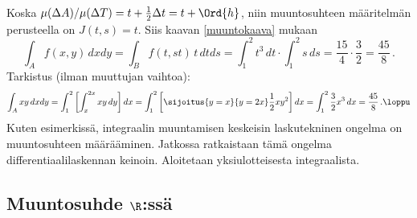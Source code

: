 Koska $\mu(\Delta A)/\mu(\Delta T)=t+\frac{1}{2}\Delta t = t + \Ord{h}$, niin muuntosuhteen
määritelmän perusteella on $J(t,s)=t$. Siis kaavan \eqref{muuntokaava} mukaan
\[
\int_A f(x,y)\,dxdy = \int_B f(t,st)\,t\,dtds = \int_1^2 t^3\,dt\cdot\int_1^2 s\,ds 
                    = \frac{15}{4}\cdot\frac{3}{2} = \frac{45}{8}\,.
\]
Tarkistus (ilman muuttujan vaihtoa):
\[
\int_A xy\,dxdy = \int_1^2\left[\int_x^{2x} xy\,dy\right]dx
                = \int_1^2\left[\sijoitus{y=x}{y=2x} \frac{1}{2}xy^2\right]dx
                = \int_1^2 \frac{3}{2}x^3\,dx = \frac{45}{8}\,. \loppu
\]
Kuten esimerkissä, integraalin muuntamisen keskeisin laskutekninen ongelma on muuntosuhteen
määrääminen. Jatkossa ratkaistaan tämä ongelma differentiaalilaskennan keinoin. Aloitetaan
yksiulotteisesta integraalista.


\subsection*{Muuntosuhde $\R$:ssä}

